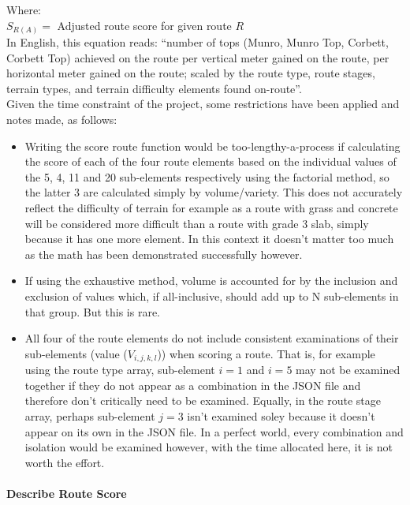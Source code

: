 \documentclass[11pt, english]{article}
\begin{document}
	Where:\\
	$S_{R(A)}=$ Adjusted route score for given route $R$\\

	In English, this equation reads: ``number of tops (Munro, Munro Top, Corbett, Corbett Top) achieved on the route per vertical meter gained on the route, per horizontal meter gained on the route; scaled by the route type, route stages, terrain types, and terrain difficulty elements found on-route''.\\

	Given the time constraint of the project, some restrictions have been applied and notes made, as follows:

	\begin{itemize}
	\setlength\itemsep{0cm}
		\item Writing the score route function would be too-lengthy-a-process if calculating the score of each of the four route elements based on the individual values of the 5, 4, 11 and 20 sub-elements respectively using the factorial method, so the latter 3 are calculated simply by volume/variety. This does not accurately reflect the difficulty of terrain for example as a route with grass and concrete will be considered more difficult than a route with grade 3 slab, simply because it has one more element. In this context it doesn't matter too much as the math has been demonstrated successfully however.
		\item If using the exhaustive method, volume is accounted for by the inclusion and exclusion of values which, if all-inclusive, should add up to N sub-elements in that group. But this is rare.
		\item All four of the route elements do not include consistent examinations of their sub-elements (value ($V_{i,j,k,l}$)) when scoring a route. That is, for example using the route type array, sub-element $i=1$ and $i=5$ may not be examined together if they do not appear as a combination in the JSON file and therefore don't critically need to be examined. Equally, in the route stage array, perhaps sub-element $j=3$ isn't examined soley because it doesn't appear on its own in the JSON file. In a perfect world, every combination and isolation would be examined however, with the time allocated here, it is not worth the effort.
	\end{itemize}

			\paragraph{Describe Route Score}
\end{document}
